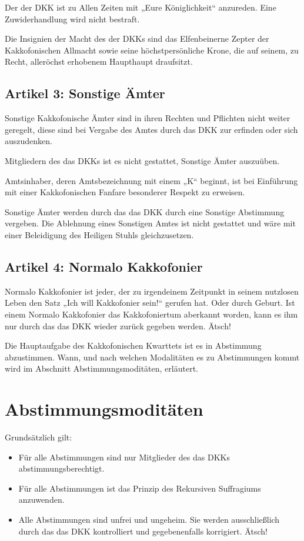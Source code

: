 \documentclass[ngerman, fontsize=12pt, parskip=half, footsepline]{scrartcl}
\begin{document}
Der der DKK ist zu Allen Zeiten mit „Eure Königlichkeit“ anzureden. Eine Zuwiderhandlung wird nicht bestraft.

Die Insignien der Macht des der DKKs sind das Elfenbeinerne Zepter der Kakkofonischen Allmacht sowie seine höchstpersönliche Krone, die auf seinem, zu Recht, alleröchst erhobenem Haupthaupt draufsitzt.

\subsection*{Artikel 3: Sonstige Ämter}
Sonstige Kakkofonische Ämter sind in ihren Rechten und Pflichten nicht weiter geregelt, diese sind bei Vergabe des Amtes durch das DKK zur erfinden oder sich auszudenken.

Mitgliedern des das DKKs ist es nicht gestattet, Sonstige Ämter auszuüben.

Amtsinhaber, deren Amtsbezeichnung mit einem „K“ beginnt, ist bei Einführung mit einer Kakkofonischen Fanfare besonderer Respekt zu erweisen.

Sonstige Ämter werden durch das das DKK durch eine Sonstige Abstimmung vergeben. Die Ablehnung eines Sonstigen Amtes ist nicht gestattet und wäre mit einer Beleidigung des Heiligen Stuhls gleichzusetzen.

\subsection*{Artikel 4: Normalo Kakkofonier}
Normalo Kakkofonier ist jeder, der zu irgendeinem Zeitpunkt in seinem nutzlosen Leben den Satz „Ich will Kakkofonier sein!“ gerufen hat. Oder durch Geburt. Ist einem Normalo Kakkofonier das Kakkofoniertum aberkannt worden, kann es ihm nur durch das das DKK wieder zurück gegeben werden. Ätsch!

Die Hauptaufgabe des Kakkofonischen Kwarttets ist es in Abstimmung abzustimmen. Wann, und nach welchen Modalitäten es zu Abstimmungen kommt wird im Abschnitt Abstimmungsmoditäten, erläutert.

\section{Abstimmungsmoditäten}
Grundsätzlich gilt:
\begin{itemize}
	\item Für alle Abstimmungen sind nur Mitglieder des das DKKs abstimmungsberechtigt.
    \item Für alle Abstimmungen ist das Prinzip des Rekursiven Suffragiums anzuwenden.
    \item Alle Abstimmungen sind unfrei und ungeheim. Sie werden ausschließlich durch das das DKK kontrolliert und gegebenenfalls korrigiert. Ätsch!
\end{itemize}
\end{document}
